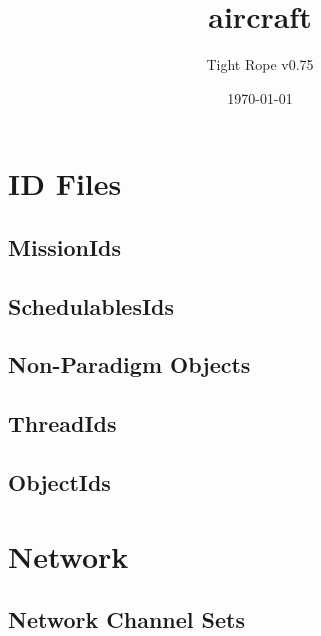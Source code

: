 \documentclass[10pt,a4paper]{article}
\title{aircraft}
\author{Tight Rope v0.75}
\date{\today}
\begin{document}
\maketitle

\section{ID Files}
\subsection{MissionIds}

\newpage

\subsection{SchedulablesIds}

\newpage

\subsection{Non-Paradigm Objects}
\newpage

\subsection{ThreadIds}

\newpage

\subsection{ObjectIds}

\newpage

\section{Network}
\subsection{Network Channel Sets}




{}
\end{document}
